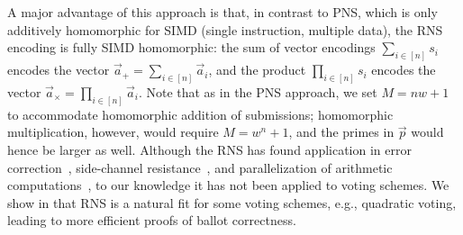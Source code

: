 A major advantage of this approach is that, in contrast to PNS, which is only additively homomorphic for SIMD (single instruction, multiple data), the RNS encoding is fully SIMD homomorphic: the sum of vector encodings $\sum_{i \in [n]} s_i$ encodes the vector $\vec{a}_{+} = \sum_{i \in [n]} \vec{a}_i$, and the product $\prod_{i \in [n]} s_i$ encodes the vector $\vec{a}_{\times} = \prod_{i \in [n]} \vec{a}_i$. 
Note that as in the PNS approach, we set $M = nw + 1$ to accommodate homomorphic addition of submissions; homomorphic multiplication, however, would require $M=w^n+1$, and the primes in $\vec{p}$ would hence be larger as well.
Although the RNS has found application in error correction~\cite{TayCha14,KPTOC22}, side-channel resistance~\cite{TCHES:PFPB18}, and parallelization of arithmetic computations~\cite{AsiHosKon17,BajDuqMel06,GomTyaNam11,VNLVC20}, to our knowledge it has not been applied to voting schemes. We show in  that RNS is a natural fit for some voting schemes, e.g., quadratic voting, leading to more efficient proofs of ballot correctness. 